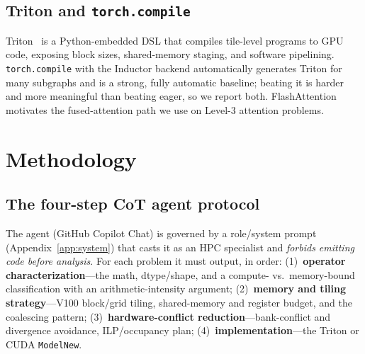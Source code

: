 \documentclass[conference]{IEEEtran}
\begin{document}
\subsection{Triton and \texttt{torch.compile}}
Triton~\cite{triton} is a Python-embedded DSL that compiles tile-level programs
to GPU code, exposing block sizes, shared-memory staging, and software
pipelining. \texttt{torch.compile} with the Inductor backend automatically
generates Triton for many subgraphs and is a strong, fully automatic baseline;
beating it is harder and more meaningful than beating eager, so we report both.
FlashAttention~\cite{flashattention} motivates the fused-attention path we use
on Level-3 attention problems.

\section{Methodology}
\subsection{The four-step CoT agent protocol}
The agent (GitHub Copilot Chat) is governed by a role/system prompt
(Appendix~\ref{app:system}) that casts it as an HPC specialist and
\emph{forbids emitting code before analysis}. For each problem it must output,
in order: (1)~\textbf{operator characterization}---the math, dtype/shape, and a
compute- vs.\ memory-bound classification with an arithmetic-intensity argument;
(2)~\textbf{memory and tiling strategy}---V100 block/grid tiling, shared-memory
and register budget, and the coalescing pattern; (3)~\textbf{hardware-conflict
reduction}---bank-conflict and divergence avoidance, ILP/occupancy plan;
(4)~\textbf{implementation}---the Triton or CUDA \texttt{ModelNew}.
\end{document}
